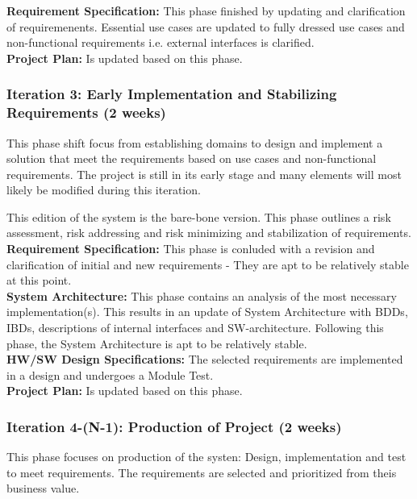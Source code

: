 \textbf{Requirement Specification:} This phase finished by updating and clarification of requiremenents. Essential use cases are updated to fully dressed use cases and non-functional requirements i.e. external interfaces is clarified. \\

\textbf{Project Plan:} Is updated based on this phase.

\subsubsection{Iteration 3: Early Implementation and Stabilizing Requirements (2 weeks)}
This phase shift focus from establishing domains to design and implement a solution that meet the requirements based on use cases and non-functional requirements. The project is still in its early stage and many elements will most likely be modified during this iteration. \newline

This edition of the system is the bare-bone version. This phase outlines a risk assessment, risk addressing and risk minimizing and stabilization of requirements. \\

\textbf{Requirement Specification:} This phase is conluded with a revision and clarification of initial and new requirements - They are apt to be relatively stable at this point. \\

\textbf{System Architecture:} This phase contains an analysis of the most necessary implementation(s). This results in an update of System Architecture with BDDs, IBDs, descriptions of internal interfaces and SW-architecture. Following this phase, the System Architecture is apt to be relatively stable. \\

\textbf{HW/SW Design Specifications:} The selected requirements are implemented in a design and undergoes a Module Test. \\

\textbf{Project Plan:} Is updated based on this phase. \\

\subsubsection{Iteration 4-(N-1): Production of Project (2 weeks)}
This phase focuses on production of the systen: Design, implementation and test to meet requirements. The requirements are selected and prioritized from theis business value. \newline

